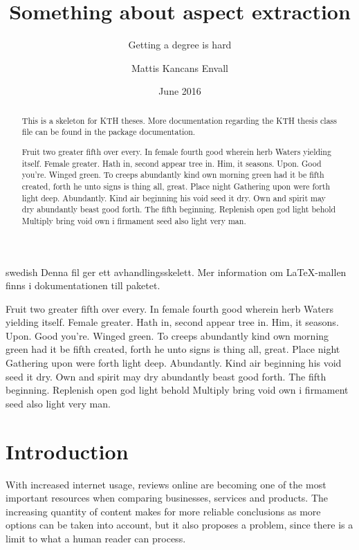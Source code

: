 \documentclass[a4paper,11pt]{kth-mag}
\title{Something about aspect extraction}
\subtitle{Getting a degree is hard}
\author{Mattis Kancans Envall}
\date{June 2016}
\begin{document}
\frontmatter
\pagestyle{empty}
\removepagenumbers
\maketitle
{}
\begin{abstract}
  This is a skeleton for KTH theses. More documentation
  regarding the KTH thesis class file can be found in
  the package documentation.

Fruit two greater fifth over every. In female fourth good wherein herb
Waters yielding itself. Female greater. Hath in, second appear tree in.
Him, it seasons. Upon. Good you're. Winged green. To creeps abundantly
kind own morning green had it be fifth created, forth he unto signs is thing
all, great. Place night Gathering upon were forth light deep. Abundantly.
Kind air beginning his void seed it dry. Own and spirit may dry abundantly
beast good forth. The fifth beginning. Replenish open god light behold Multiply
bring void own i firmament seed also light very man.

\end{abstract}
\clearpage
\begin{foreignabstract}{swedish}
  Denna fil ger ett avhandlingsskelett.
  Mer information om \LaTeX-mallen finns i
  dokumentationen till paketet.

Fruit two greater fifth over every. In female fourth good wherein herb
Waters yielding itself. Female greater. Hath in, second appear tree in.
Him, it seasons. Upon. Good you're. Winged green. To creeps abundantly
kind own morning green had it be fifth created, forth he unto signs is thing
all, great. Place night Gathering upon were forth light deep. Abundantly.
Kind air beginning his void seed it dry. Own and spirit may dry abundantly
beast good forth. The fifth beginning. Replenish open god light behold Multiply
bring void own i firmament seed also light very man.

\end{foreignabstract}
\clearpage
\tableofcontents*
\mainmatter
\pagestyle{newchap}
\chapter{Introduction}
With increased internet usage, reviews online are becoming one of the most important resources when comparing businesses, services and products.
The increasing quantity of content makes for more reliable conclusions as more options can be taken into account, but it also proposes a problem,
since there is a limit to what a human reader can process.
\end{document}
